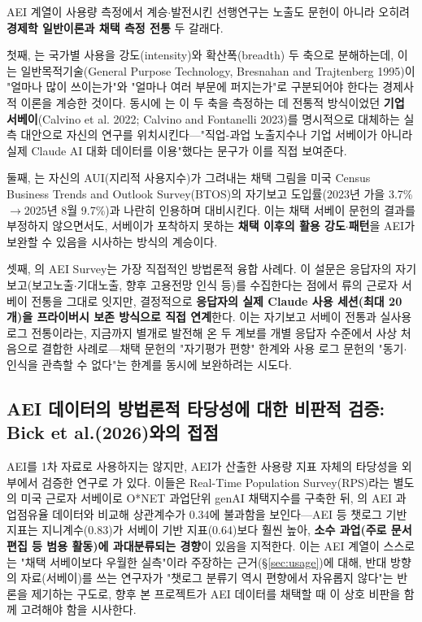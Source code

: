 \documentclass[11pt]{article}
\begin{document}
AEI 계열이 사용량 측정에서 계승$\cdot$발전시킨 선행연구는 노출도 문헌이 아니라 오히려 \textbf{경제학 일반이론과 채택 측정 전통} 두 갈래다.

첫째, \citet{fan-2026-what-countries-use-ai-and}는 국가별 사용을 강도(intensity)와 확산폭(breadth) 두 축으로 분해하는데, 이는 일반목적기술(General Purpose Technology, Bresnahan and Trajtenberg 1995)이 "얼마나 많이 쓰이는가"와 "얼마나 여러 부문에 퍼지는가"로 구분되어야 한다는 경제사적 이론을 계승한 것이다. 동시에 \citet{fan-2026-what-countries-use-ai-and}는 이 두 축을 측정하는 데 전통적 방식이었던 \textbf{기업 서베이}(Calvino et al. 2022; Calvino and Fontanelli 2023)를 명시적으로 대체하는 실측 대안으로 자신의 연구를 위치시킨다—"직업-과업 노출지수나 기업 서베이가 아니라 실제 Claude AI 대화 데이터를 이용"했다는 문구가 이를 직접 보여준다.

둘째, \citet{appel-2025-uneven-geographic-and-enterprise-ai}는 자신의 AUI(지리적 사용지수)가 그려내는 채택 그림을 미국 Census Business Trends and Outlook Survey(BTOS)의 자기보고 도입률(2023년 가을 3.7\%$\to$2025년 8월 9.7\%)과 나란히 인용하며 대비시킨다. 이는 채택 서베이 문헌의 결과를 부정하지 않으면서도, 서베이가 포착하지 못하는 \textbf{채택 이후의 활용 강도$\cdot$패턴}을 AEI가 보완할 수 있음을 시사하는 방식의 계승이다.

셋째, \citet{massenkoff-2026-cadences}의 AEI Survey는 가장 직접적인 방법론적 융합 사례다. 이 설문은 응답자의 자기보고(보고노출$\cdot$기대노출, 향후 고용전망 인식 등)를 수집한다는 점에서 \citet{bick-2026-mind-the-gap-ai-adoption}류의 근로자 서베이 전통을 그대로 잇지만, 결정적으로 \textbf{응답자의 실제 Claude 사용 세션(최대 20개)을 프라이버시 보존 방식으로 직접 연계}한다. 이는 자기보고 서베이 전통과 실사용 로그 전통이라는, 지금까지 별개로 발전해 온 두 계보를 개별 응답자 수준에서 사상 처음으로 결합한 사례로—채택 문헌의 "자기평가 편향" 한계와 사용 로그 문헌의 "동기$\cdot$인식을 관측할 수 없다"는 한계를 동시에 보완하려는 시도다.

\subsection{AEI 데이터의 방법론적 타당성에 대한 비판적 검증: Bick et al.(2026)와의 접점}
\label{sec:bick}

AEI를 1차 자료로 사용하지는 않지만, AEI가 산출한 사용량 지표 자체의 타당성을 외부에서 검증한 연구로 \citet{bick-2026-what-work-does-generative}가 있다. 이들은 Real-Time Population Survey(RPS)라는 별도의 미국 근로자 서베이로 O*NET 과업단위 genAI 채택지수를 구축한 뒤, \citet{handa-2025-which-economic-tasks-are}의 AEI 과업점유율 데이터와 비교해 상관계수가 0.34에 불과함을 보인다—AEI 등 챗로그 기반 지표는 지니계수(0.83)가 서베이 기반 지표(0.64)보다 훨씬 높아, \textbf{소수 과업(주로 문서편집 등 범용 활동)에 과대분류되는 경향}이 있음을 지적한다. 이는 AEI 계열이 스스로는 "채택 서베이보다 우월한 실측"이라 주장하는 근거(\S\ref{sec:usage})에 대해, 반대 방향의 자료(서베이)를 쓰는 연구자가 "챗로그 분류기 역시 편향에서 자유롭지 않다"는 반론을 제기하는 구도로, 향후 본 프로젝트가 AEI 데이터를 채택할 때 이 상호 비판을 함께 고려해야 함을 시사한다.
\end{document}
